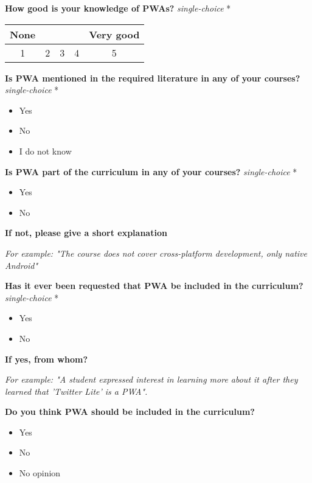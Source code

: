 \documentclass[a4paper,12pt]{article}
\begin{document}
\textbf{How good is your knowledge of PWAs?}  \textit{single-choice} *

\begin{tabular}{ccccc}
    None & & & & Very good \\
    \hline
    \multicolumn{1}{|c|}{1} & \multicolumn{1}{c|}{2} & \multicolumn{1}{c|}{3} & \multicolumn{1}{c|}{4} & \multicolumn{1}{c|}{5} \\
     \hline
\end{tabular}

\quad

\quad

\textbf{Is PWA mentioned in the required literature in any of your courses?} \textit{single-choice} *
\begin{itemize}
    \item Yes
    \item No
    \item I do not know
\end{itemize}

\textbf{Is PWA part of the curriculum in any of your courses?} \textit{single-choice} *
\begin{itemize}
    \item Yes
    \item No
\end{itemize}

\textbf{If not, please give a short explanation}

\textit{For example: "The course does not cover cross-platform development, only native Android"}

\quad

\textbf{Has it ever been requested that PWA be included in the curriculum?} \textit{single-choice} *
\begin{itemize}
    \item Yes
    \item No
\end{itemize}

\textbf{If yes, from whom?}

\textit{For example: "A student expressed interest in learning more about it after they learned that 'Twitter Lite' is a PWA".}

\quad

\textbf{Do you think PWA should be included in the curriculum?}
\begin{itemize}
    \item Yes
    \item No
    \item No opinion
\end{itemize}
\end{document}
